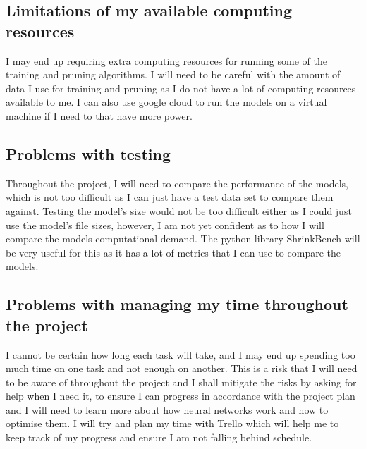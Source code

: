 \documentclass{article}
\begin{document}
\subsection{Limitations of my available computing resources}
I may end up requiring extra computing resources for running some of the training and pruning algorithms.
I will need to be careful with the amount of data I use for training and pruning as I do not have a lot of computing resources available to me.
I can also use google cloud to run the models on a virtual machine if I need to that have more power.

\subsection{Problems with testing}
Throughout the project, I will need to compare the performance of the models, 
which is not too difficult as I can just have a test data set to compare 
them against. Testing the model's size would not be too difficult 
either as I could just use the model's file sizes, however, I am 
not yet confident as to how I will compare the models computational demand.
The python library ShrinkBench \cite{ShrinkBench} will be very useful for this 
as it has a lot of metrics that I can use to compare the models.

\subsection{Problems with managing my time throughout the project}
I cannot be certain how long each task will take, and I may end up spending too much time on one task and not enough on another.
This is a risk that I will need to be aware of throughout the project and I shall mitigate the risks by asking for help when I need it, to ensure I can progress in accordance with the project plan and I will need to learn more about how neural networks work 
and how to optimise them. I will try and plan my time with Trello \cite{Trello} which will help me to keep track of my progress and ensure I am not falling behind schedule.


\pagebreak

\printbibliography
\end{document}
